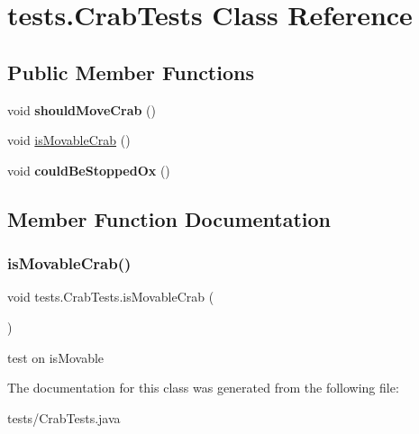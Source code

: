 \hypertarget{classtests_1_1_crab_tests}{}\section{tests.\+Crab\+Tests Class Reference}
\label{classtests_1_1_crab_tests}
\subsection*{Public Member Functions}
\begin{DoxyCompactItemize}
\item 
\mbox{\label{classtests_1_1_crab_tests_a993d6a9afed7b341bca83836f49bf602}} 
void {\bfseries should\+Move\+Crab} ()
\item 
void \mbox{\hyperlink{classtests_1_1_crab_tests_a995106565f790757dd5df4619ba84d97}{is\+Movable\+Crab}} ()
\item 
\mbox{\label{classtests_1_1_crab_tests_a2177db7c9a4d5c05f6499180f8bb4a66}} 
void {\bfseries could\+Be\+Stopped\+Ox} ()
\end{DoxyCompactItemize}


\subsection{Member Function Documentation}
\mbox{\label{classtests_1_1_crab_tests_a995106565f790757dd5df4619ba84d97}} 
\subsubsection{\texorpdfstring{is\+Movable\+Crab()}{isMovableCrab()}}
{\footnotesize\ttfamily void tests.\+Crab\+Tests.\+is\+Movable\+Crab (\begin{DoxyParamCaption}{ }\end{DoxyParamCaption})\hspace{0.3cm}{\ttfamily [inline]}}

test on is\+Movable 

The documentation for this class was generated from the following file\+:\begin{DoxyCompactItemize}
\item 
tests/Crab\+Tests.\+java\end{DoxyCompactItemize}

